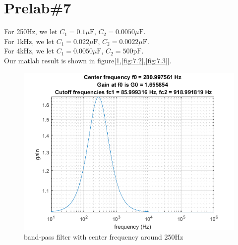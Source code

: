 \documentclass{IEEEtran}
\begin{document}
	\section{\textbf{Prelab\#7}}
	\hfil \newline
	\phantom{ } For 250$ \si{\hertz} $, we let $ C_1 = 0.1\mu\si{\farad} $, $ C_2 = 0.0050\mu\si{\farad} $.\\
	\phantom{ } For 1$ \si{\kilo\hertz} $, we let $ C_1 = 0.022\mu\si{\farad} $, $ C_2 = 0.0022\mu\si{\farad} $.\\
	\phantom{ } For 4$ \si{\kilo\hertz} $, we let $ C_1 = 0.0050\mu\si{\farad} $, $ C_2 = 500\si{\pico\farad} $.\\
	\phantom{ } Our matlab result is shown in figure[\ref{fig:7.1},\ref{fig:7.2},\ref{fig:7.3}].
	\begin{figure}[!htbp]
		\centering
		\begin{framed}
			\includegraphics[width=\linewidth]{images/7_1.png}
			\caption{band-pass filter with center frequency around 250Hz}
			\label{fig:7.1}
		\end{framed}
	\end{figure}
\end{document}
